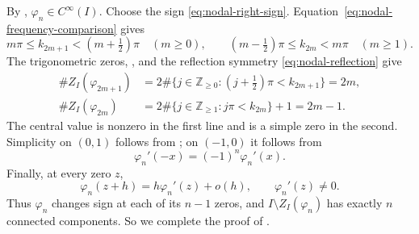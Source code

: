 \documentclass[11pt]{amsart}
\numberwithin{equation}{section}
\theoremstyle{remark}
\begin{document}
By , $\varphi_n\in C^\infty(I)$.
Choose the sign \eqref{eq:nodal-right-sign}.
Equation~\eqref{eq:nodal-frequency-comparison} gives
\[
 m\pi\le k_{2m+1}<(m+\tfrac12)\pi\quad(m\ge0),\qquad
 (m-\tfrac12)\pi\le k_{2m}<m\pi\quad(m\ge1).
\]
The trigonometric zeros, , and the reflection symmetry
\eqref{eq:nodal-reflection} give
\begin{align*}
 \#Z_I(\varphi_{2m+1})
 &=2\#\{j\in\mathbb Z_{\ge0}:(j+\tfrac12)\pi<k_{2m+1}\}
 =2m,\\
 \#Z_I(\varphi_{2m})
 &=2\#\{j\in\mathbb Z_{\ge1}:j\pi<k_{2m}\}+1
 =2m-1.
\end{align*}
The central value is nonzero in the first line and is a simple zero in
the second. Simplicity on $(0,1)$ follows from ;
on $(-1,0)$ it follows from
\[
 \varphi_n'(-x)=(-1)^n\varphi_n'(x).
\]
Finally, at every zero $z$,
\[
 \varphi_n(z+h)=h\varphi_n'(z)+o(h),\qquad\varphi_n'(z)\ne0.
\]
Thus $\varphi_n$ changes sign at each of its $n-1$ zeros, and
$I\setminus Z_I(\varphi_n)$ has exactly $n$ connected components.
So we complete the proof of .
\end{document}
